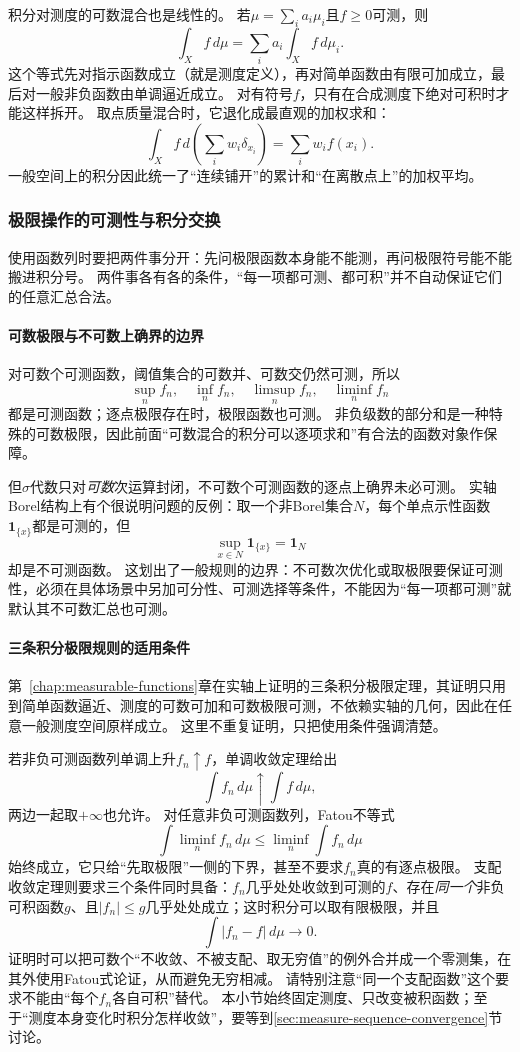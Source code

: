 积分对测度的可数混合也是线性的。
若$\mu=\sum_i a_i\mu_i$且$f\geq0$可测，则
\[
 \int_X f\,d\mu=\sum_i a_i\int_X f\,d\mu_i.
\]
这个等式先对指示函数成立（就是测度定义），再对简单函数由有限可加成立，最后对一般非负函数由单调逼近成立。
对有符号$f$，只有在合成测度下绝对可积时才能这样拆开。
取点质量混合时，它退化成最直观的加权求和：
\[
 \int_X f\,d\!\left(\sum_i w_i\delta_{x_i}\right)=\sum_i w_i f(x_i).
\]
一般空间上的积分因此统一了“连续铺开”的累计和“在离散点上”的加权平均。

\subsubsection{极限操作的可测性与积分交换}

使用函数列时要把两件事分开：先问极限函数本身能不能测，再问极限符号能不能搬进积分号。
两件事各有各的条件，“每一项都可测、都可积”并不自动保证它们的任意汇总合法。

\paragraph{可数极限与不可数上确界的边界}

对可数个可测函数，阈值集合的可数并、可数交仍然可测，所以
\[
 \sup_n f_n,\quad\inf_n f_n,\quad\limsup_n f_n,\quad\liminf_n f_n
\]
都是可测函数；逐点极限存在时，极限函数也可测。
非负级数的部分和是一种特殊的可数极限，因此前面“可数混合的积分可以逐项求和”有合法的函数对象作保障。

但$\sigma$代数只对\emph{可数}次运算封闭，不可数个可测函数的逐点上确界未必可测。
实轴Borel结构上有个很说明问题的反例：取一个非Borel集合$N$，每个单点示性函数$\mathbf 1_{\{x\}}$都是可测的，但
\[
 \sup_{x\in N}\mathbf 1_{\{x\}}=\mathbf 1_N
\]
却是不可测函数。
这划出了一般规则的边界：不可数次优化或取极限要保证可测性，必须在具体场景中另加可分性、可测选择等条件，不能因为“每一项都可测”就默认其不可数汇总也可测。

\paragraph{三条积分极限规则的适用条件}

第~\ref{chap:measurable-functions}章在实轴上证明的三条积分极限定理，其证明只用到简单函数逼近、测度的可数可加和可数极限可测，不依赖实轴的几何，因此在任意一般测度空间原样成立。
这里不重复证明，只把使用条件强调清楚。

若非负可测函数列单调上升$f_n\uparrow f$，单调收敛定理给出
\[
 \int f_n\,d\mu\uparrow\int f\,d\mu,
\]
两边一起取$+\infty$也允许。
对任意非负可测函数列，Fatou不等式
\[
 \int\liminf_n f_n\,d\mu\leq\liminf_n\int f_n\,d\mu
\]
始终成立，它只给“先取极限”一侧的下界，甚至不要求$f_n$真的有逐点极限。
支配收敛定理则要求三个条件同时具备：$f_n$几乎处处收敛到可测的$f$、存在\emph{同一个}非负可积函数$g$、且$|f_n|\leq g$几乎处处成立；这时积分可以取有限极限，并且
\[
 \int|f_n-f|\,d\mu\to0.
\]
证明时可以把可数个“不收敛、不被支配、取无穷值”的例外合并成一个零测集，在其外使用Fatou式论证，从而避免无穷相减。
请特别注意“同一个支配函数”这个要求不能由“每个$f_n$各自可积”替代。
本小节始终固定测度、只改变被积函数；至于“测度本身变化时积分怎样收敛”，要等到\ref{sec:measure-sequence-convergence}节讨论。


